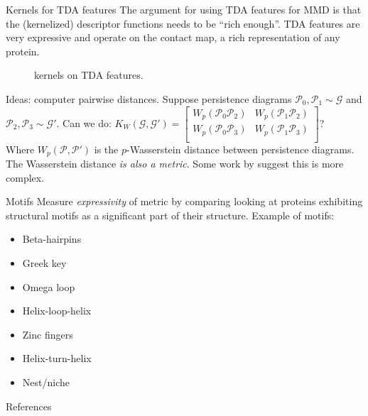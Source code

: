\documentclass[aspectratio=169, 10pt, dvipsnames, handout]{beamer}
\begin{document}
\begin{frame}[fragile]{Kernels for TDA features}
  The argument for using TDA features for MMD is that the (kernelized)
  descriptor functions needs to be ``rich enough''. TDA features are very
  expressive and operate on the contact map, a rich representation of any protein.
  \begin{figure}[center]
    \centering
    \caption{kernels on TDA features.}
    \label{fig:overview}
  \end{figure}
  Ideas: computer pairwise distances. Suppose persistence diagrams $\mathcal{P}_0,
  \mathcal{P}_1\sim\mathcal{G}$ and $\mathcal{P}_2, \mathcal{P}_3\sim\mathcal{G}'$.
  Can we do:
  $K_{W}(\mathcal{G},\mathcal{G}')=\begin{bmatrix}
    W_p(\mathcal{P}_0\mathcal{P}_2) & W_p(\mathcal{P}_1\mathcal{P}_2)\\
    W_p(\mathcal{P}_0\mathcal{P}_3) & W_p(\mathcal{P}_1\mathcal{P}_3)\\
  \end{bmatrix}$?\\
  Where $W_p(\mathcal{P},\mathcal{P}')$ is the $p$-Wasserstein distance between
  persistence diagrams. \\
  The Wasserstein distance \textit{is also a metric}. Some work by \cite{oh2019kernel} suggest this is more complex.
\end{frame}


\begin{frame}[fragile]{Motifs}
  Measure \textit{expressivity} of metric by comparing looking at proteins exhibiting
  structural motifs as a significant part of their structure. Example of motifs:
  \begin{itemize}
  \item Beta-hairpins
  \item Greek key
  \item Omega loop
  \item Helix-loop-helix
  \item Zinc fingers
  \item Helix-turn-helix
  \item Nest/niche
  \end{itemize}
\end{frame}

\begin{frame}[allowframebreaks]{References}

  
  

\end{frame}
\end{document}

